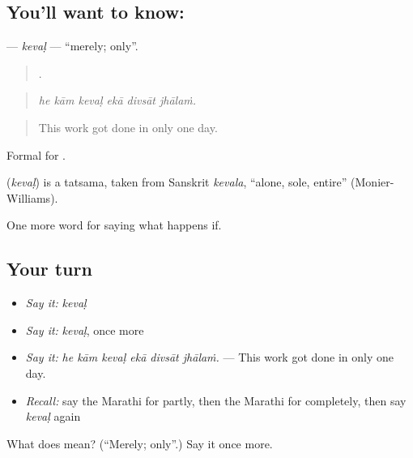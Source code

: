 \subsection*{You'll want to know: }
\textbf{} — \emph{kevaḷ} — \textquotedblleft{}merely; only\textquotedblright{}.

\begin{quote}
     .
\end{quote}

\begin{quote}
\emph{he kām kevaḷ ekā divsāt jhālaṁ.}
\end{quote}

\begin{quote}
This work got done in only one day.
\end{quote}

Formal for .

\begin{cousinweb}
\textbf{} (\emph{kevaḷ}) is a tatsama, taken from Sanskrit \emph{kevala}, \textquotedblleft{}alone, sole, entire\textquotedblright{} (Monier-Williams).
\end{cousinweb}

\begin{grammarlens}[title={What you've built}]
One more word for saying what happens if.
\end{grammarlens}

\subsection*{Your turn}
\begin{itemize}
\raggedright
  \item \emph{Say it:} \emph{kevaḷ}
  \item \emph{Say it:} \emph{kevaḷ}, once more
  \item \emph{Say it:} \emph{he kām kevaḷ ekā divsāt jhālaṁ.} — This work got done in only one day.
  \item \emph{Recall:} say the Marathi for partly, then the Marathi for completely, then say \emph{kevaḷ} again
\end{itemize}

\begin{tcolorbox}[breakable,colback=teal!4,colframe=teal!35!black,title={Before you move on}]
What does  mean? (\textquotedblleft{}Merely; only\textquotedblright{}.) Say it once more.
\end{tcolorbox}
